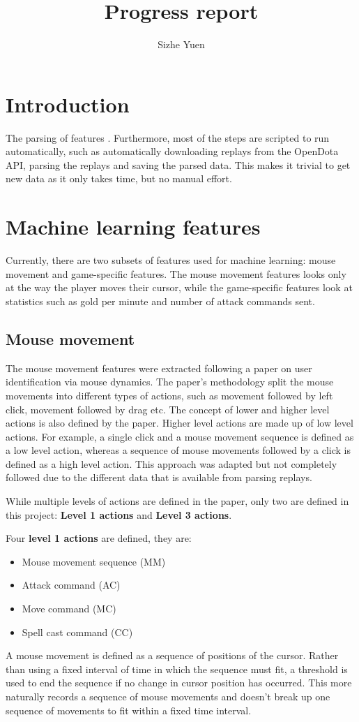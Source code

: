 \documentclass{../sty/SizheArticle}
\title{Progress report}
\author{Sizhe Yuen}
\begin{document}

\section{Introduction}
The parsing of features . Furthermore, most of the steps are scripted to run automatically, such as automatically downloading replays from the OpenDota API, parsing the replays and saving the parsed data. This makes it trivial to get new data as it only takes time, but no manual effort. 

\section{Machine learning features}
Currently, there are two subsets of features used for machine learning: mouse movement and game-specific features. The mouse movement features looks only at the way the player moves their cursor, while the game-specific features look at statistics such as gold per minute and number of attack commands sent. 

\subsection{Mouse movement}
The mouse movement features were extracted following a paper \cite{mouse-dynamics} on user identification via mouse dynamics. The paper's methodology split the mouse movements into different types of actions, such as movement followed by left click, movement followed by drag etc. The concept of lower and higher level actions is also defined by the paper. Higher level actions are made up of low level actions. For example, a single click and a mouse movement sequence is defined as a low level action, whereas a sequence of mouse movements followed by a click is defined as a high level action. This approach was adapted but not completely followed due to the different data that is available from parsing replays.

While multiple levels of actions are defined in the paper, only two are defined in this project: \textbf{Level 1 actions} and \textbf{Level 3 actions}.

Four \textbf{level 1 actions} are defined, they are:
\begin{itemize}
\item Mouse movement sequence (MM)
\item Attack command (AC)
\item Move command (MC)
\item Spell cast command (CC)
\end{itemize}
A mouse movement is defined as a sequence of positions of the cursor. Rather than using a fixed interval of time in which the sequence must fit, a threshold is used to end the sequence if no change in cursor position has occurred. This more naturally records a sequence of mouse movements and doesn't break up one sequence of movements to fit within a fixed time interval. 
\end{document}
